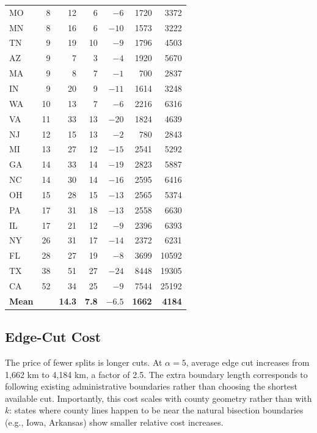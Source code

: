 \begin{table}[t]
\begin{tabular}{lrrrrrr}
MO  & 8  & 12 & 6  & $-6$ & 1720  & 3372  \\
MN  & 8  & 16 & 6  & $-10$& 1573  & 3222  \\
TN  & 9  & 19 & 10 & $-9$ & 1796  & 4503  \\
AZ  & 9  & 7  & 3  & $-4$ & 1920  & 5670  \\
MA  & 9  & 8  & 7  & $-1$ & 700   & 2837  \\
IN  & 9  & 20 & 9  & $-11$& 1614  & 3248  \\
WA  & 10 & 13 & 7  & $-6$ & 2216  & 6316  \\
VA  & 11 & 33 & 13 & $-20$& 1824  & 4639  \\
NJ  & 12 & 15 & 13 & $-2$ & 780   & 2843  \\
MI  & 13 & 27 & 12 & $-15$& 2541  & 5292  \\
GA  & 14 & 33 & 14 & $-19$& 2823  & 5887  \\
NC  & 14 & 30 & 14 & $-16$& 2595  & 6416  \\
OH  & 15 & 28 & 15 & $-13$& 2565  & 5374  \\
PA  & 17 & 31 & 18 & $-13$& 2558  & 6630  \\
IL  & 17 & 21 & 12 & $-9$ & 2396  & 6393  \\
NY  & 26 & 31 & 17 & $-14$& 2372  & 6231  \\
FL  & 28 & 27 & 19 & $-8$ & 3699  & 10592 \\
TX  & 38 & 51 & 27 & $-24$& 8448  & 19305 \\
CA  & 52 & 34 & 25 & $-9$ & 7544  & 25192 \\
\midrule
\textbf{Mean} & & \textbf{14.3} & \textbf{7.8} & \textbf{$-6.5$} &
  \textbf{1662} & \textbf{4184} \\
\bottomrule
\end{tabular}
\end{table}

\subsection{Edge-Cut Cost}

The price of fewer splits is longer cuts.
At $\alpha = 5$, average edge cut increases from 1,662 km to 4,184 km, a factor
of 2.5.
The extra boundary length corresponds to following existing administrative
boundaries rather than choosing the shortest available cut.
Importantly, this cost scales with county geometry rather than with $k$: states
where county lines happen to be near the natural bisection boundaries (e.g.,
Iowa, Arkansas) show smaller relative cost increases.

